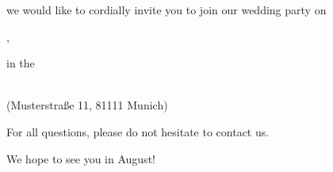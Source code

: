 %
\vfil
\noindent we would like to cordially invite you to join our wedding party on 

\begin{center}
    \selectfont{}, 
\end{center}
in the
\begin{center}
    \selectfont{}\\
    (Musterstra\ss e 11, 81111 Munich)
\end{center}

\vfill{}

\noindent
For all questions, please do not hesitate to contact us.  

\vfill

\raggedright
We hope to see you in August!\RowSepVar{4ex}

\vfill 
